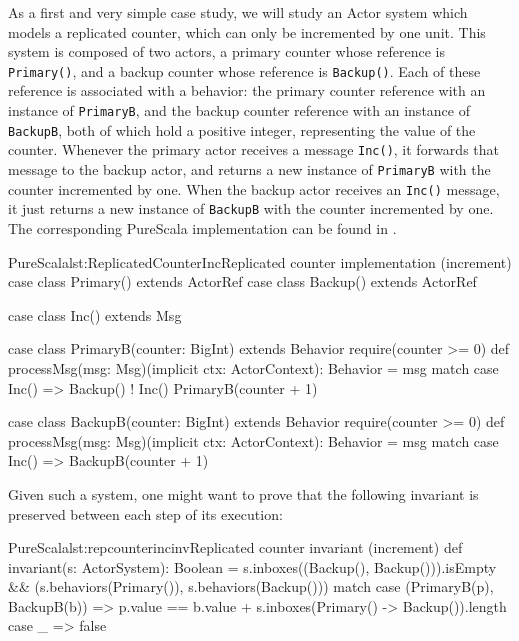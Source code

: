 As a first and very simple case study, we will study an Actor system which models a
replicated counter, which can only be incremented by one unit. This system is 
composed of two actors, a primary counter whose reference is \texttt{Primary()},
and a backup counter whose reference is \texttt{Backup()}.
Each of these reference is associated with a behavior: the primary counter reference with
an instance of \texttt{PrimaryB}, and the backup counter reference with an instance 
of \texttt{BackupB}, both of which hold a positive integer, representing the value of the
counter. Whenever the primary actor receives a message \texttt{Inc()}, it forwards that
message to the backup actor, and returns a new instance of \texttt{PrimaryB} with the
counter incremented by one. When the backup actor receives an \texttt{Inc()} message,
it just returns a new instance of \texttt{BackupB} with the counter incremented by one. 
The corresponding PureScala implementation can be found
in .

\begin{Code}{PureScala}{lst:ReplicatedCounterInc}{Replicated counter implementation (increment)}
case class Primary() extends ActorRef
case class Backup()  extends ActorRef

case class Inc() extends Msg

case class PrimaryB(counter: BigInt) extends Behavior {
  require(counter >= 0)
  def processMsg(msg: Msg)(implicit ctx: ActorContext): Behavior = msg match {
    case Inc() =>
      Backup() ! Inc()
      PrimaryB(counter + 1)
  }
}

case class BackupB(counter: BigInt) extends Behavior {
  require(counter >= 0)
  def processMsg(msg: Msg)(implicit ctx: ActorContext): Behavior = msg match {
    case Inc() => BackupB(counter + 1)
  }
}
\end{Code}

Given such a system, one might want to prove that the following invariant is 
preserved between each step of its execution:

\begin{Code}{PureScala}{lst:repcounterincinv}{Replicated counter invariant (increment)}
def invariant(s: ActorSystem): Boolean = {
  s.inboxes((Backup(), Backup())).isEmpty && {
    (s.behaviors(Primary()), s.behaviors(Backup())) match {
      case (PrimaryB(p), BackupB(b)) =>
        p.value == b.value + s.inboxes(Primary() -> Backup()).length
      case _ => false
    }
  }
}
\end{Code}


